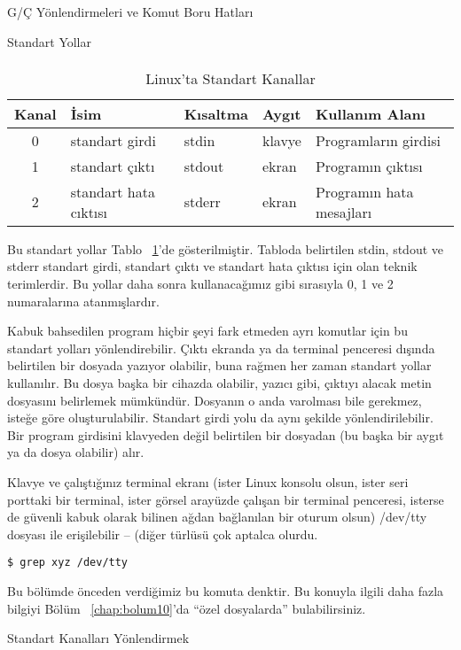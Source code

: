 \begin{section}{G/Ç Yönlendirmeleri ve Komut Boru Hatları}
\begin{subsection}{Standart Yollar}
\paragraph{}{
\begin {table}[H]
\caption {Linux'ta Standart Kanallar} \label{tab:tablo81} 
\begin{tabular}{c l l l l}
\hline
Kanal & İsim & Kısaltma & Aygıt & Kullanım Alanı\\
\hline
0	& standart girdi &		stdin	&	klavye	&   Programların girdisi\\
1	&standart çıktı&      	stdout&		ekran&	   Programın çıktısı\\
2 	&standart hata cıktısı  &       stderr	&	ekran	&   Programın hata mesajları \\
\hline
\end{tabular}
\end {table}
}

Bu standart yollar Tablo ~\ref{tab:tablo81}'de gösterilmiştir. Tabloda belirtilen stdin, stdout ve stderr standart girdi, standart çıktı ve standart hata çıktısı için olan teknik terimlerdir. Bu yollar daha sonra kullanacağımız gibi sırasıyla 0, 1 ve 2 numaralarına atanmışlardır.

Kabuk bahsedilen program hiçbir şeyi fark etmeden ayrı komutlar için bu standart yolları yönlendirebilir. Çıktı ekranda ya da terminal penceresi dışında belirtilen bir dosyada yazıyor olabilir, buna rağmen her zaman standart yollar kullanılır. Bu dosya başka bir cihazda olabilir, yazıcı gibi, çıktıyı alacak metin dosyasını belirlemek mümkündür. Dosyanın o anda varolması bile gerekmez, isteğe göre oluşturulabilir. Standart girdi yolu da aynı şekilde yönlendirilebilir. Bir program girdisini klavyeden değil belirtilen bir dosyadan (bu başka bir aygıt ya da dosya olabilir) alır.

Klavye ve çalıştığınız terminal ekranı (ister Linux konsolu olsun, ister seri porttaki bir terminal, ister görsel arayüzde çalışan bir terminal penceresi, isterse de güvenli kabuk olarak bilinen ağdan bağlanılan bir oturum olsun) /dev/tty dosyası ile erişilebilir –  (diğer türlüsü çok aptalca olurdu.
\begin{verbatim}
$ grep xyz /dev/tty 
\end{verbatim}

Bu bölümde önceden verdiğimiz bu komuta denktir. Bu konuyla ilgili daha fazla bilgiyi Bölüm ~\ref{chap:bolum10}'da “özel dosyalarda” bulabilirsiniz.
\end{subsection}
\begin{subsection}{Standart Kanalları Yönlendirmek}


\end{subsection}
\end{section}
